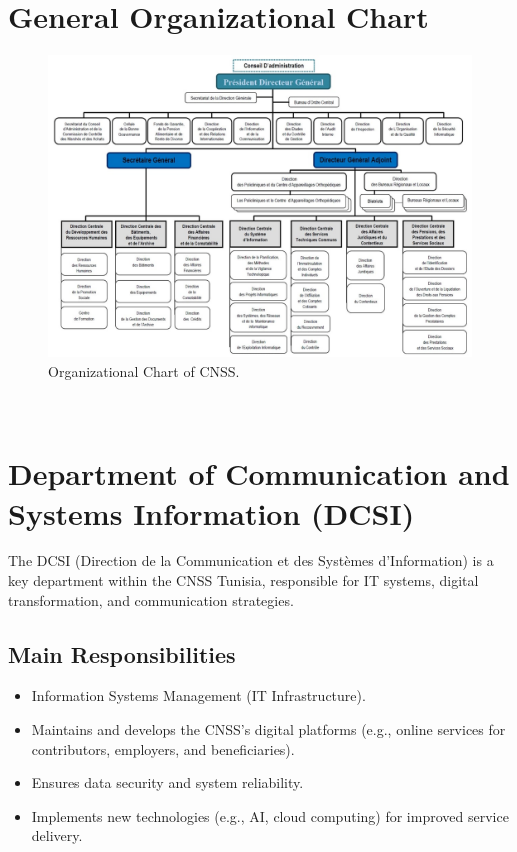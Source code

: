 \section{General Organizational Chart}
\begin{figure}[h]
    \centering
    \includegraphics[width=1\textwidth]{figures/orga cnss.jpg} 
    \caption{Organizational Chart of CNSS.}
\end{figure} \ 

\section{Department of Communication and Systems Information (DCSI)}  
The DCSI (Direction de la Communication et des Systèmes d'Information) is a key department within the CNSS Tunisia, responsible for IT systems, digital transformation, and communication strategies.

\subsection{Main Responsibilities}
\begin{itemize}
    \item Information Systems Management (IT Infrastructure).
    \item Maintains and develops the CNSS's digital platforms (e.g., online services for contributors, employers, and beneficiaries).
    \item Ensures data security and system reliability.
    \item Implements new technologies (e.g., AI, cloud computing) for improved service delivery.
\end{itemize}

